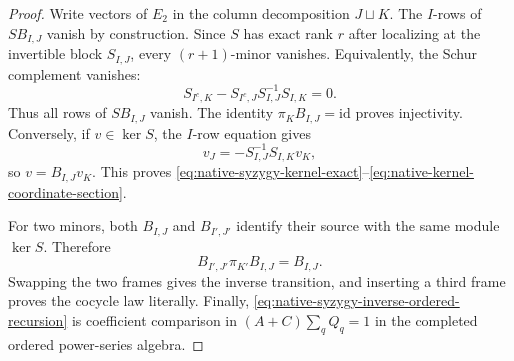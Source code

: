 \documentclass[11pt]{article}
\theoremstyle{definition}
\begin{document}
\begin{proof}
Write vectors of $E_2$ in the column decomposition $J\sqcup K$.  The $I$-rows
of $S B_{I,J}$ vanish by construction.  Since $S$ has exact rank $r$ after
localizing at the invertible block $S_{I,J}$, every $(r+1)$-minor vanishes.
Equivalently, the Schur complement vanishes:
\[
 S_{I^c,K}-S_{I^c,J}S_{I,J}^{-1}S_{I,K}=0.
\]
Thus all rows of $S B_{I,J}$ vanish.  The identity
$\pi_KB_{I,J}=\mathrm{id}$ proves injectivity.  Conversely, if $v\in\ker S$,
the $I$-row equation gives
\[
 v_J=-S_{I,J}^{-1}S_{I,K}v_K,
\]
so $v=B_{I,J}v_K$.  This proves
\eqref{eq:native-syzygy-kernel-exact}--\eqref{eq:native-kernel-coordinate-section}.

For two minors, both $B_{I,J}$ and $B_{I',J'}$ identify their source with the
same module $\ker S$.  Therefore
\[
 B_{I',J'}\pi_{K'}B_{I,J}=B_{I,J}.
\]
Swapping the two frames gives the inverse transition, and inserting a third
frame proves the cocycle law literally.  Finally,
\eqref{eq:native-syzygy-inverse-ordered-recursion} is coefficient comparison
in $(A+C)\sum_qQ_q=1$ in the completed ordered power-series algebra.
\end{proof}
\end{document}
